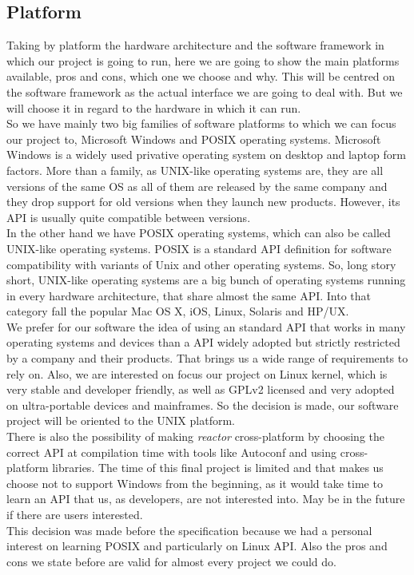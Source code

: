 \subsection{Platform}
Taking by platform the hardware architecture and the software framework in which our project is going to run, here we are going to show the
main platforms available, pros and cons, which one we choose and why. This will be centred on the software framework as the actual
interface we are going to deal with. But we will choose it in regard to the hardware in which it can run.\\
So we have mainly two big families of software platforms to which we can focus our project to, Microsoft Windows and POSIX operating
systems. Microsoft Windows is a widely used privative operating system on desktop and laptop form factors. More than a family, as UNIX-like
operating systems are, they are all versions of the same OS as all of them are released by the same company and they drop support for old 
versions when they launch new products. However, its API is usually quite compatible between versions. \\
In the other hand we have POSIX operating systems, which can also be called UNIX-like operating systems. POSIX is a standard API definition
for software compatibility with variants of Unix and other operating systems. So, long story short, UNIX-like operating systems are a big
bunch of operating systems running in every hardware architecture, that share almost the same API. Into that category fall the popular Mac 
OS X, iOS, Linux, Solaris and HP/UX.\\
We prefer for our software the idea of using an standard API that works in many operating systems and devices than a API widely adopted but
strictly restricted by a company and their products. That brings us a wide range of requirements to rely on. Also, we are interested on 
focus our project on Linux kernel, which is very stable and developer friendly, as well as GPLv2 licensed and very adopted on 
ultra-portable devices and mainframes. So the decision is made, our software project will be oriented to the UNIX platform.\\
There is also the possibility of making \emph{reactor} cross-platform by choosing the correct API at compilation time with tools like 
Autoconf and using cross-platform libraries. The time of this final project is limited and that makes us choose not to support Windows from 
the beginning, as it would take time to learn an API that us, as developers, are not interested into. May be in the future if there are
users interested.\\
This decision was made before the specification because we had a personal interest on learning POSIX and particularly on Linux API. Also 
the pros and cons we state before are valid for almost every project we could do.
